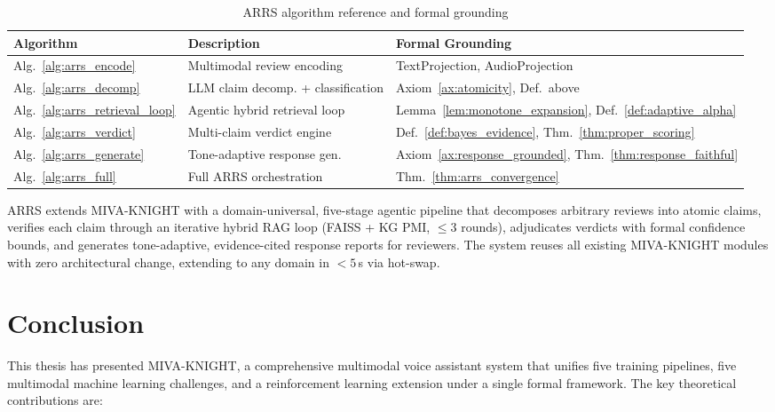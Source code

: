 \documentclass[12pt,a4paper]{article}
\theoremstyle{definition}
\theoremstyle{plain}
\theoremstyle{remark}
\begin{document}
\begin{table}[H]
\centering
\caption{ARRS algorithm reference and formal grounding}
\renewcommand{\arraystretch}{1.2}
\begin{tabular}{lll}
\toprule
\textbf{Algorithm} & \textbf{Description} & \textbf{Formal Grounding} \\
\midrule
Alg.~\ref{alg:arrs_encode} & Multimodal review encoding & TextProjection, AudioProjection \\
Alg.~\ref{alg:arrs_decomp} & LLM claim decomp. + classification & Axiom~\ref{ax:atomicity}, Def.~above \\
Alg.~\ref{alg:arrs_retrieval_loop} & Agentic hybrid retrieval loop & Lemma~\ref{lem:monotone_expansion}, Def.~\ref{def:adaptive_alpha} \\
Alg.~\ref{alg:arrs_verdict} & Multi-claim verdict engine & Def.~\ref{def:bayes_evidence}, Thm.~\ref{thm:proper_scoring} \\
Alg.~\ref{alg:arrs_generate} & Tone-adaptive response gen. & Axiom~\ref{ax:response_grounded}, Thm.~\ref{thm:response_faithful} \\
Alg.~\ref{alg:arrs_full} & Full ARRS orchestration & Thm.~\ref{thm:arrs_convergence} \\
\bottomrule
\end{tabular}
\end{table}

\begin{tcolorbox}[keybox,title={Contribution C10 --- ARRS (Agentic Review Response System)}]
ARRS extends MIVA-KNIGHT with a domain-universal, five-stage agentic pipeline 
that decomposes arbitrary reviews into atomic claims, verifies each claim through 
an iterative hybrid RAG loop (FAISS + KG PMI, $\le 3$ rounds), adjudicates 
verdicts with formal confidence bounds, and generates tone-adaptive, evidence-cited 
response reports for reviewers. The system reuses all existing MIVA-KNIGHT 
modules with zero architectural change, extending to any domain in $< 5$\,s 
via hot-swap.
\end{tcolorbox}



\newpage
\section{Conclusion}
\label{sec:conclusion}

This thesis has presented MIVA-KNIGHT, a comprehensive multimodal voice assistant system that unifies five training pipelines, five multimodal machine learning challenges, and a reinforcement learning extension under a single formal framework. The key theoretical contributions are:
\end{document}
